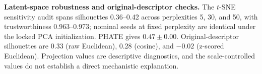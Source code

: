 \textbf{Latent-space robustness and original-descriptor checks.} The $t$-SNE sensitivity audit spans silhouettes 0.36--0.42 across perplexities 5, 30, and 50, with trustworthiness 0.963--0.973; nominal seeds at fixed perplexity are identical under the locked PCA initialization. PHATE gives $0.47\pm0.00$. Original-descriptor silhouettes are 0.33 (raw Euclidean), 0.28 (cosine), and $-0.02$ (z-scored Euclidean). Projection values are descriptive diagnostics, and the scale-controlled values do not establish a direct mechanistic explanation.
